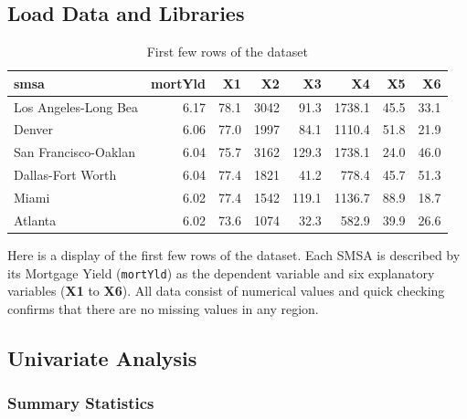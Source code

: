 \documentclass[
  11pt,
]{article}
\begin{document}
\subsection{Load Data and Libraries}\label{load-data-and-libraries}

\begingroup\fontsize{7}{9}\selectfont

\begin{longtable}[t]{lrrrrrrr}
\caption{\label{tab:unnamed-chunk-1}First few rows of the dataset}\\
\toprule
smsa & mortYld & X1 & X2 & X3 & X4 & X5 & X6\\
\midrule
Los Angeles-Long Bea & 6.17 & 78.1 & 3042 & 91.3 & 1738.1 & 45.5 & 33.1\\
Denver & 6.06 & 77.0 & 1997 & 84.1 & 1110.4 & 51.8 & 21.9\\
San Francisco-Oaklan & 6.04 & 75.7 & 3162 & 129.3 & 1738.1 & 24.0 & 46.0\\
Dallas-Fort Worth & 6.04 & 77.4 & 1821 & 41.2 & 778.4 & 45.7 & 51.3\\
Miami & 6.02 & 77.4 & 1542 & 119.1 & 1136.7 & 88.9 & 18.7\\
\addlinespace
Atlanta & 6.02 & 73.6 & 1074 & 32.3 & 582.9 & 39.9 & 26.6\\
\bottomrule
\end{longtable}
\endgroup{}

Here is a display of the first few rows of the dataset. Each SMSA is
described by its Mortgage Yield (\texttt{mortYld}) as the dependent
variable and six explanatory variables (\textbf{X1} to \textbf{X6}). All
data consist of numerical values and quick checking confirms that there
are no missing values in any region.

\subsection{Univariate Analysis}\label{univariate-analysis}

\subsubsection{Summary Statistics}\label{summary-statistics}

\begingroup\fontsize{7}{9}\selectfont
\end{document}
